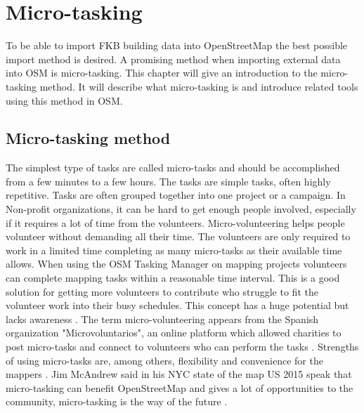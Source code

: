 \chapter{Micro-tasking}\label{ch:microtask}
To be able to import FKB building data into OpenStreetMap the best possible import method is desired. A promising method when importing external data into OSM is micro-tasking. This chapter will give an introduction to the micro-tasking method. It will describe what micro-tasking is and introduce related tools using this method in OSM. 

\section{Micro-tasking method}
The simplest type of tasks are called micro-tasks and should be accomplished from a few minutes to a few hours. The tasks are simple tasks, often highly repetitive. Tasks are often grouped together into one project or a campaign. In Non-profit organizations, it can be hard to get enough people involved, especially if it requires a lot of time from the volunteers. Micro-volunteering helps people volunteer without demanding all their time. The volunteers are only required to work in a limited time completing as many micro-tasks as their available time allows. When using the OSM Tasking Manager on mapping projects volunteers can complete mapping tasks within a reasonable time interval. This is a good solution for getting more volunteers to contribute who struggle to fit the volunteer work into their busy schedules. This concept has a huge potential but lacks awareness \cite{Bernstein}. The term micro-volunteering appears from the Spanish organization "Microvoluntarios", an online platform which allowed charities to post micro-tasks and connect to volunteers who can perform the tasks \cite{Madalena}.  Strengths of using micro-tasks are, among others, flexibility and convenience for the mappers \cite{Madalena}. Jim McAndrew said in his NYC state of the map US 2015 speak that micro-tasking can benefit OpenStreetMap and gives a lot of opportunities to the community, micro-tasking is the way of the future \cite{McAndrew2015}.  

